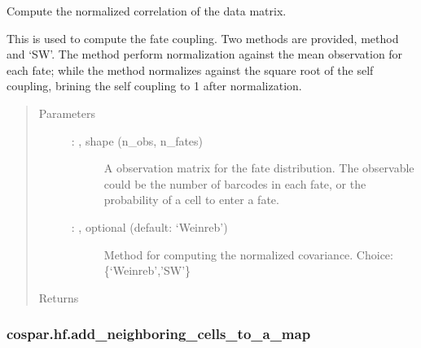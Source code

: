 \documentclass[letterpaper,10pt,english]{sphinxmanual}
\begin{document}
\begin{fulllineitems}
\label{\detokenize{cospar.hf.get_normalized_covariance:cospar.hf.get_normalized_covariance}}
Compute the normalized correlation of the data matrix.

This is used to compute the fate coupling.
Two methods are provided,  method and ‘SW’.
The  method perform normalization against the mean observation
for each fate; while the  method normalizes against the square root of
the self coupling, brining the self coupling to 1 after normalization.
\begin{quote}\begin{description}
\item[{Parameters}] \leavevmode\begin{description}
\item[{ : , shape (n\_obs, n\_fates)}] \leavevmode
A observation matrix for the fate distribution. The observable
could be the number of barcodes in each fate, or the probability
of a cell to enter a fate.

\item[{ : , optional (default: ‘Weinreb’)}] \leavevmode
Method for computing the normalized covariance. Choice: \{‘Weinreb’,’SW’\}

\end{description}

\item[{Returns}] \leavevmode
{}

\end{description}\end{quote}

\end{fulllineitems}



\subsubsection{cospar.hf.add\_neighboring\_cells\_to\_a\_map}
\label{\detokenize{cospar.hf.add_neighboring_cells_to_a_map:cospar-hf-add-neighboring-cells-to-a-map}}\label{\detokenize{cospar.hf.add_neighboring_cells_to_a_map::doc}}
\end{document}
